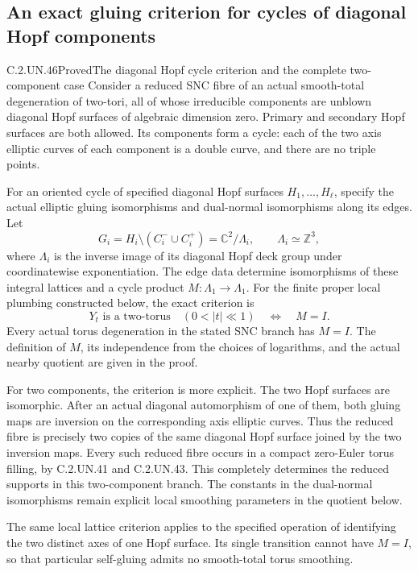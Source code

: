 \subsection{An exact gluing criterion for cycles of diagonal Hopf components}

\begin{statement}{C.2.UN.46}{Proved}{The diagonal Hopf cycle criterion and the complete two-component case}
Consider a reduced SNC fibre of an actual smooth-total
degeneration of two-tori, all of whose irreducible components
are unblown diagonal Hopf surfaces of algebraic dimension zero.
Primary and secondary Hopf surfaces are both allowed.
Its components form a cycle: each of the two axis elliptic
curves of each component is a double curve, and there are
no triple points.

For an oriented cycle of specified diagonal Hopf surfaces
$H_1,\ldots,H_\ell$, specify the actual elliptic gluing
isomorphisms and dual-normal isomorphisms along its edges.
Let
\[
 G_i=H_i\setminus(C_i^-\cup C_i^+)
       =\mathbb C^2/\Lambda_i,\qquad \Lambda_i\simeq\mathbb Z^3,
\tag{C.HC.1}
\]
where $\Lambda_i$ is the inverse image of its diagonal
Hopf deck group under coordinatewise exponentiation.
The edge data determine isomorphisms of these integral
lattices and a cycle product $M:\Lambda_1\to\Lambda_1$.
For the finite proper local plumbing constructed below,
the exact criterion is
\[
 \text{$Y_t$ is a two-torus}\quad(0<|t|\ll1)
       \quad\Longleftrightarrow\quad M=I.
\tag{C.HC.2}
\]
Every actual torus degeneration in the stated SNC branch
has $M=I$. The definition of $M$, its independence from
the choices of logarithms, and the actual nearby quotient
are given in the proof.

For two components, the criterion is more explicit.
The two Hopf surfaces are isomorphic. After an actual
diagonal automorphism of one of them, both gluing maps
are inversion on the corresponding axis elliptic curves.
Thus the reduced fibre is precisely two copies of the
same diagonal Hopf surface joined by the two inversion
maps. Every such reduced fibre occurs in a compact
zero-Euler torus filling, by C.2.UN.41 and C.2.UN.43.
This completely determines the reduced supports in
this two-component branch. The constants in the
dual-normal isomorphisms remain explicit local
smoothing parameters in the quotient below.

The same local lattice criterion applies to the
specified operation of identifying the two distinct
axes of one Hopf surface. Its single transition
cannot have $M=I$, so that particular self-gluing
admits no smooth-total torus smoothing.
\end{statement}

